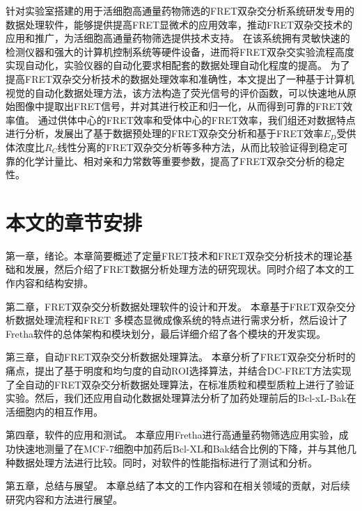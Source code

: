 针对实验室搭建的用于活细胞高通量药物筛选的FRET双杂交分析系统研发专用的数据处理软件，能够提供提高FRET显微术的应用效率，推动FRET双杂交技术的应用和推广，为活细胞高通量药物筛选提供技术支持。
在该系统拥有灵敏快速的检测仪器和强大的计算机控制系统等硬件设备，进而将FRET双杂交实验流程高度实现自动化，实验仪器的自动化要求相配套的数据处理自动化程度的提高。
为了提高FRET双杂交分析技术的数据处理效率和准确性，本文提出了一种基于计算机视觉的自动化数据处理方法，该方法构造了荧光信号的评价函数，可以快速地从原始图像中提取出FRET信号，并对其进行校正和归一化，从而得到可靠的FRET效率值。
通过供体中心的FRET效率和受体中心的FRET效率，我们组还对数据特点进行分析，发展出了基于数据预处理的FRET双杂交分析和基于FRET效率$E_D$受供体浓度比$R_C$线性分离的FRET双杂交分析等多种方法，从而比较验证得到稳定可靠的化学计量比、相对亲和力常数等重要参数，提高了FRET双杂交分析的稳定性。
\fi

\section{本文的章节安排}

\ifshowtext
第一章，绪论。本章简要概述了定量FRET技术和FRET双杂交分析技术的理论基础和发展，然后介绍了FRET数据分析处理方法的研究现状。同时介绍了本文的工作内容和结构安排。

第二章，FRET双杂交分析数据处理软件的设计和开发。
本章基于FRET双杂交分析数据处理流程和FRET 多模态显微成像系统的特点进行需求分析，然后设计了Fretha软件的总体架构和模块划分，最后详细介绍了各个模块的开发实现。

第三章，自动FRET双杂交分析数据处理算法。
本章分析了FRET双杂交分析时的痛点，提出了基于明度和均匀度的自动ROI选择算法，并结合DC-FRET方法实现了全自动的FRET双杂交分析数据处理算法，在标准质粒和模型质粒上进行了验证实验。然后，我们还应用自动化数据处理算法分析了加药处理前后的Bcl-xL-Bak在活细胞内的相互作用。

第四章，软件的应用和测试。
本章应用Fretha进行高通量药物筛选应用实验，成功快速地测量了在MCF-7细胞中加药后Bcl-XL和Bak结合比例的下降，并与其他几种数据处理方法进行比较。同时，对软件的性能指标进行了测试和分析。

第五章，总结与展望。
本章总结了本文的工作内容和在相关领域的贡献，对后续研究内容和方法进行展望。
\fi

